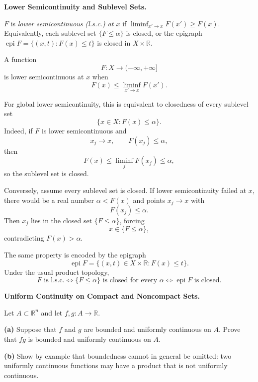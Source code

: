 \begin{problem}[CP-II-0093]
\label{prob:cp-ii-0093}
\textbf{Lower Semicontinuity and Sublevel Sets.}

\hspace*{1.5em}$F$ is \emph{lower semicontinuous (l.s.c.) at $x$} if
		$\displaystyle \liminf_{x'\to x} F(x') \ge F(x)$.
		Equivalently, each sublevel set $\{F\le \alpha\}$ is closed, or
		the epigraph $\operatorname{epi}F=\{(x,t):F(x)\le t\}$ is closed in $X\times\mathbb R$.
\end{problem}

\begin{solution}
A function
\[
F:X\to(-\infty,+\infty]
\]
is lower semicontinuous at \(x\) when
\[
\boxed{
F(x)\le\liminf_{x'\to x}F(x').
}
\]

For global lower semicontinuity, this is equivalent to closedness of every sublevel set
\[
\{x\in X:F(x)\le\alpha\}.
\]
Indeed, if \(F\) is lower semicontinuous and
\[
x_j\to x,\qquad F(x_j)\le\alpha,
\]
then
\[
F(x)
\le
\liminf_jF(x_j)
\le
\alpha,
\]
so the sublevel set is closed.

Conversely, assume every sublevel set is closed. If lower semicontinuity failed at \(x\),
there would be a real number \(\alpha<F(x)\) and points \(x_j\to x\) with
\[
F(x_j)\le\alpha.
\]
Then \(x_j\) lies in the closed set \(\{F\le\alpha\}\), forcing
\[
x\in\{F\le\alpha\},
\]
contradicting \(F(x)>\alpha\).

The same property is encoded by the epigraph
\[
\operatorname{epi}F
=
\{(x,t)\in X\times\mathbb R:F(x)\le t\}.
\]
Under the usual product topology,
\[
\boxed{
F\text{ is l.s.c.}
\iff
\{F\le\alpha\}\text{ is closed for every }\alpha
\iff
\operatorname{epi}F\text{ is closed}.
}
\]
\end{solution}


\begin{problem}[CP-II-0094]
\label{prob:cp-ii-0094}
\textbf{Uniform Continuity on Compact and Noncompact Sets.}

\hspace*{1.5em}Let \(A\subset\mathbb R^n\) and let \(f,g:A\to\mathbb R\).

\par\noindent\textbf{(a)}\quad
Suppose that \(f\) and \(g\) are bounded and uniformly continuous
on \(A\). Prove that \(fg\) is bounded and uniformly continuous on \(A\).

\par\noindent\textbf{(b)}\quad
Show by example that boundedness cannot in general be omitted:
two uniformly continuous functions may have a product that is not
uniformly continuous.
\end{problem}


